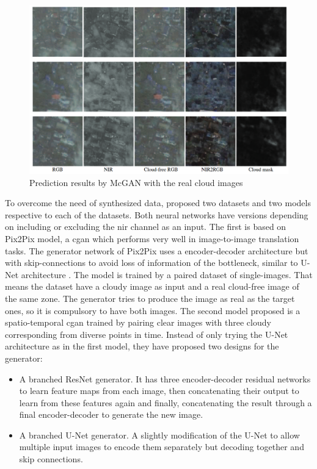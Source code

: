 \documentclass[11pt, a4paper]{article}
\begin{document}
	\begin{figure}[H]
	\centering
	\includegraphics[width=12cm]{imgs/relatedwork/mcgan-real.png}
	\caption{Prediction results by McGAN with the real cloud images}
	\label{fig:related-mcgan-real}
\end{figure}
	To overcome the need of synthesized data, \cite{sarukkai2019cloud} proposed two datasets and two models respective to each of the datasets. Both neural networks have versions depending on including or excluding the \gls{nir} channel as an input. The first is based on Pix2Pix \cite{pix2pix2017} model, a \gls{cgan} which performs very well in image-to-image translation tasks. The generator network of Pix2Pix  uses a encoder-decoder architecture but with skip-connections to avoid loss of information of the bottleneck, similar to U-Net architecture \cite{unet}. The model is trained by a paired dataset of single-images. That means the dataset have a cloudy image as input and a real cloud-free image of the same zone. The generator tries to produce the image as real as the target ones, so it is compulsory to have both images.  The second model proposed is a spatio-temporal \gls{cgan} trained by pairing clear images with three cloudy corresponding from diverse points in time. Instead of only trying the U-Net architecture as in the first model, they have proposed two designs for the generator:
	\begin{itemize}
		\item A branched ResNet generator. It has three encoder-decoder residual networks to learn feature maps from each image, then concatenating their output to learn from these features again and finally, concatenating the result through a final encoder-decoder to generate the new image.
		\item A branched U-Net generator. A slightly modification of the U-Net to allow multiple input images to encode them separately but decoding together and skip connections.
	\end{itemize}
\end{document}
